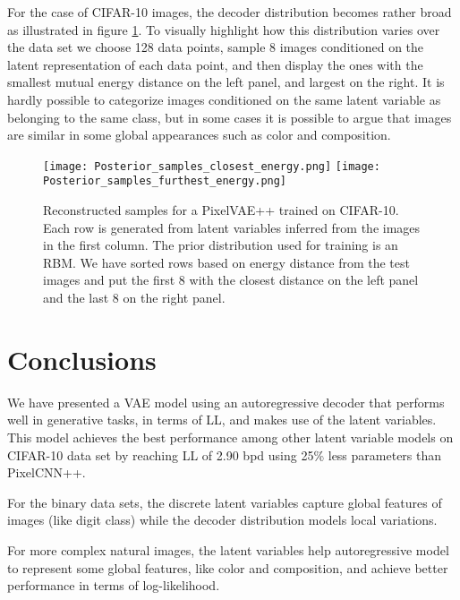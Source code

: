 \documentclass{article}
\begin{document}
For the case of CIFAR-10 images, the decoder distribution becomes rather broad as illustrated in figure \ref{fig:cond_cifar}. To visually highlight how this distribution varies over the data set we choose 128 data points, sample  8 images conditioned on the latent representation of each data point, and then display the ones with the smallest mutual energy distance \cite{salimans2017pixelcnn++} on the left panel, and largest on the right. It is hardly possible to categorize images conditioned on the same latent variable as belonging to the same class, but in some cases it is possible to argue that images are similar in some global appearances such as color and composition.


\begin{figure}[htbp]
    \centering
    \texttt{[image: Posterior\_samples\_closest\_energy.png]}
    \texttt{[image: Posterior\_samples\_furthest\_energy.png]}
    \caption{Reconstructed samples for a PixelVAE++ trained on CIFAR-10. Each row is generated from latent variables inferred from the images in the first column. The prior distribution used for training is an RBM. We have sorted rows based on energy distance from the test images and put the first 8 with the closest distance on the left panel and the last 8 on the right panel.}
    \label{fig:cond_cifar}
\end{figure}




 

\section{Conclusions}
We have presented a VAE model using an autoregressive decoder that performs well in generative tasks, in terms of LL, and makes use of the latent variables. This model achieves the best performance among other latent variable models on CIFAR-10 data set by reaching LL of 2.90 bpd using 25\% less parameters than PixelCNN++. 

For the binary data sets, the discrete latent variables capture global features of images (like digit class) while the decoder distribution models local variations.

For more complex natural images, the latent variables help autoregressive model to represent some global features, like color and composition, and achieve better performance in terms of log-likelihood.
\end{document}
